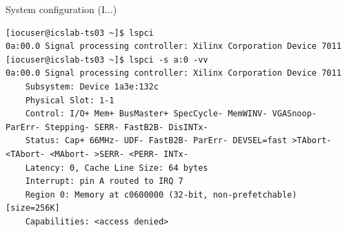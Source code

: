 \documentclass[
  9pt
  , table
  , ignorenonframetext
]{beamer}
\begin{document}
%
%
%
%
%
%
%
%
%

\begin{frame}[fragile]{System configuration (I...)}
\begin{lstlisting}[style=termstyle,breaklines=true,basicstyle=\scriptsize]
[iocuser@icslab-ts03 ~]$ lspci
0a:00.0 Signal processing controller: Xilinx Corporation Device 7011
[iocuser@icslab-ts03 ~]$ lspci -s a:0 -vv
0a:00.0 Signal processing controller: Xilinx Corporation Device 7011
	Subsystem: Device 1a3e:132c
	Physical Slot: 1-1
	Control: I/O+ Mem+ BusMaster+ SpecCycle- MemWINV- VGASnoop- ParErr- Stepping- SERR- FastB2B- DisINTx-
	Status: Cap+ 66MHz- UDF- FastB2B- ParErr- DEVSEL=fast >TAbort- <TAbort- <MAbort- >SERR- <PERR- INTx-
	Latency: 0, Cache Line Size: 64 bytes
	Interrupt: pin A routed to IRQ 7
	Region 0: Memory at c0600000 (32-bit, non-prefetchable) [size=256K]
	Capabilities: <access denied>

\end{lstlisting}
\end{frame}
\end{document}
